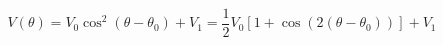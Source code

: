 \begin{equation}
\label{eq:Photodiode_Voltage}
V(\theta) = V_{0} \cos^2(\theta - {\theta}_0)+ V_{1} = \frac{1}{2}V_0\left[1 + \cos(2 (\theta - \theta_0))\right]+ V_1
\end{equation}